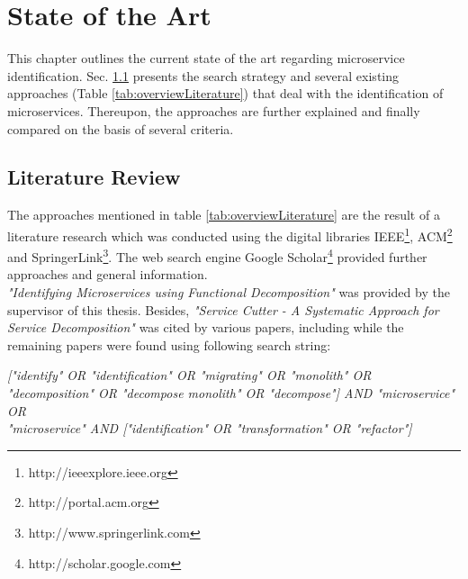 

\chapter{State of the Art}
\label{ch:StateOfTheArt}
This chapter outlines the current state of the art regarding microservice identification.  Sec. \ref{sec:StateOfTheArt:LiteratureReview} presents the search strategy and several existing approaches (Table \ref{tab:overviewLiterature}) that deal with the identification of microservices. Thereupon, the approaches are further explained and finally compared on the basis of several criteria.

\section{Literature Review}
\label{sec:StateOfTheArt:LiteratureReview}
The approaches mentioned in table \ref{tab:overviewLiterature} are the result of a literature research which was conducted using the digital libraries IEEE\footnote{http://ieeexplore.ieee.org }, ACM\footnote{http://portal.acm.org} and SpringerLink\footnote{http://www.springerlink.com }. The web search engine Google Scholar\footnote{http://scholar.google.com} provided further approaches and general information. \\ 
\textit{"Identifying Microservices using Functional Decomposition"} \cite{FunctionalDecompositionHeinrich} was provided by the supervisor of this thesis. Besides, \textit{"Service Cutter - A Systematic Approach for Service Decomposition"} \cite{ServiceCutter} was cited by various papers, including \cite{interfaceAnalysisBaresi} while the remaining papers were found using following search string: 

\vspace{1cm}
\begin{centering}
{\itshape
   ["identify" OR "identification" OR "migrating" OR "monolith" OR "decomposition" OR "decompose monolith"
  	OR "decompose"] AND  "microservice"  \\
  	   OR \\  "microservice"  AND ["identification" OR "transformation" OR "refactor"]
} \\

 
   
\end{centering}
\vspace{1cm}

